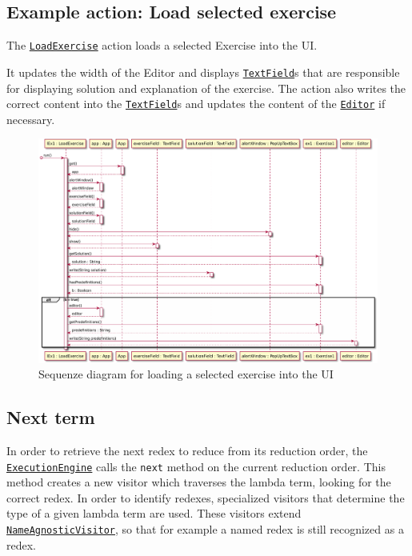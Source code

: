 \subsection{Example action: Load selected exercise}
The \texttt{\hyperref[type:edu.kit.wavelength.client.view.action.LoadExercise]{LoadExercise}} 
action loads a selected Exercise into the UI.

It updates the width of the Editor and displays \texttt{\hyperref[type:edu.kit.wavelength.client.view.webui.component.TextField]{TextField}}s 
that are responsible for displaying solution and explanation of the exercise.
The action also writes the correct content into the \texttt{\hyperref[type:edu.kit.wavelength.client.view.webui.component.TextField]{TextField}}s and updates the content of the \texttt{\hyperref[type:edu.kit.wavelength.client.view.webui.component.Editor]{Editor}} if necessary.

\begin{figure}[H]
	\centering
	\includegraphics[width=\textwidth]{sequenceDiagrams/loadExercise}
	\caption{Sequenze diagram for loading a selected exercise into the UI}
\end{figure}

\subsection{Next term}
\label{sec:nt}
In order to retrieve the next redex to reduce from its reduction order, the
\texttt{\hyperref[type:edu.kit.wavelength.client.model.ExecutionEngine]{ExecutionEngine}}
calls the \texttt{next} method on the current reduction order. This method creates a new visitor which traverses
the lambda term, looking for the correct redex. In order to identify redexes,
specialized visitors that determine the type of a given lambda term are used.
These visitors extend \texttt{\hyperref[type:edu.kit.wavelength.client.model.term.NameAgnosticVisitor]{NameAgnosticVisitor}},
so that for example a named redex is still recognized as a redex.




